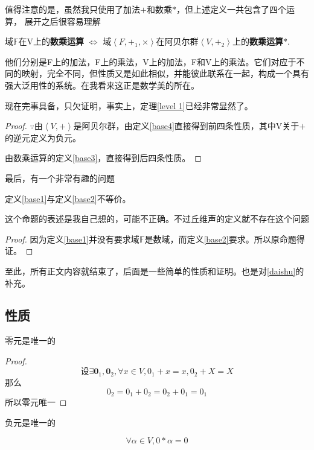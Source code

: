 \documentclass[12pt,hyperref,a4paper,UTF8]{ctexart}
\begin{document}
值得注意的是，虽然我只使用了加法$+$和数乘$*$，但上述定义一共包含了四个运算，
展开之后很容易理解

域$\mathbb{F}$在V上的\textbf{数乘运算} $\Longleftrightarrow$
域$\left< F,+_1,\times \right>$在阿贝尔群$\left< V,+_2 \right>$上的\textbf{数乘运算}$*$.

他们分别是F上的加法，F上的乘法，V上的加法，F和V上的乘法。它们对应于不同的映射，完全不同，但性质又是如此相似，并能彼此联系在一起，构成一个具有强大泛用性的系统。在我看来这正是数学美的所在。

现在完事具备，只欠证明，事实上，定理\ref{level 1}已经非常显然了。

\begin{proof}
    $\because $由$\left<V,+\right>$是阿贝尔群，由定义\ref{base4}直接得到前四条性质，其中V关于$+$的逆元定义为负元。
    
    由数乘运算的定义\ref{base3}，直接得到后四条性质。
\end{proof}

最后，有一个非常有趣的问题
\begin{Proposition}
    定义\ref{base1}与定义\ref{base2}不等价。
\end{Proposition}

这个命题的表述是我自己想的，可能不正确。不过丘维声的定义就不存在这个问题
\begin{proof}
    因为定义\ref{base1}并没有要求域$\mathbb{F}$是数域，而定义\ref{base2}要求。所以原命题得证。
\end{proof}

至此，所有正文内容就结束了，后面是一些简单的性质和证明。也是对\ref{daishu}的补充。


\subsection{性质}

\begin{Proposition}
    零元是唯一的
\end{Proposition}

\begin{proof}

\[
\text{设} \exists \mathbf{0}_1,\mathbf{0}_2 ,\forall x\in V,0_1+x=x,0_2+X=X
\]
那么
$$0_2=0_1+0_2=0_2+0_1=0_1$$
所以零元唯一
\end{proof}

\begin{Proposition}
负元是唯一的
\end{Proposition}

\begin{Proposition}
$$\forall \alpha\in V , 0*\alpha=0$$
\end{Proposition}
\end{document}
